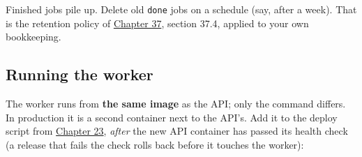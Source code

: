 \noindent{}Finished jobs pile up. Delete old \texttt{done} jobs on a schedule (say, after a week). That is the retention policy of \hyperref[ch:37-reliability]{Chapter 37}, section 37.4, applied to your own bookkeeping.

\subsection*{Running the worker}\label{41-event-driven-architecture:running-the-worker}

The worker runs from \textbf{the same image} as the API; only the command differs. In production it is a second container next to the API's. Add it to the deploy script from \hyperref[ch:23-code-transfer]{Chapter 23}, \emph{after} the new API container has passed its health check (a release that fails the check rolls back before it touches the worker):

